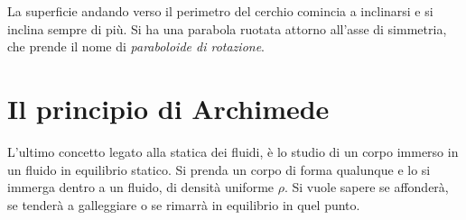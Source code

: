 \documentclass[10pt,a4paper]{book}
\begin{document}
\begin{figure}[htpb]
\end{figure}
\FloatBarrier
La superficie andando verso il perimetro del cerchio comincia a inclinarsi e si inclina sempre di più. Si ha una parabola ruotata attorno all'asse di simmetria, che prende il nome di \emph{paraboloide di rotazione}.







































\section{Il principio di Archimede}

L'ultimo concetto legato alla statica dei fluidi, è lo studio di un corpo immerso in un fluido in equilibrio statico. Si prenda un corpo di forma qualunque e lo si immerga dentro a un fluido, di densità uniforme $\rho$. Si vuole sapere se affonderà, se tenderà a galleggiare o se rimarrà in equilibrio in quel punto.
\end{document}
